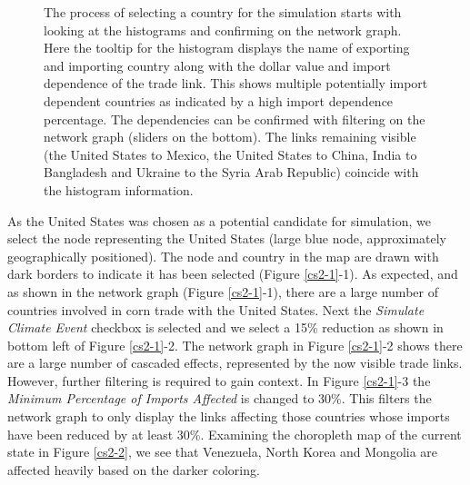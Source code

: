 \begin{figure}[htb]
	\caption[PROCESS OF SELECTING A COUNTRY FOR THE SIMULATION]{The process of selecting a country for the simulation starts with looking at the histograms and confirming on the network graph. Here the tooltip for the histogram displays the name of exporting and importing country along with the dollar value and import dependence of the trade link. This shows multiple potentially import dependent countries as indicated by a high import dependence percentage. The dependencies can be confirmed with filtering on the network graph (sliders on the bottom). The links remaining visible (the United States to Mexico, the United States to China, India to Bangladesh and Ukraine to the Syria Arab Republic) coincide with the histogram information.}
	\label{cs2-0}
\end{figure}
As the United States was chosen as a potential candidate for simulation, we select the node representing the United States (large blue node, approximately geographically positioned). The node and country in the map are drawn with dark borders to indicate it has been selected (Figure \ref{cs2-1}-1). As expected, and as shown in the network graph (Figure \ref{cs2-1}-1), there are a large number of countries involved in corn trade with the United States. Next the \textit{Simulate Climate Event} checkbox is selected and we select a 15\% reduction as shown in bottom left of Figure \ref{cs2-1}-2. The network graph in Figure \ref{cs2-1}-2 shows there are a large number of cascaded effects, represented by the now visible trade links. However, further filtering is required to gain context. In Figure \ref{cs2-1}-3 the \textit{Minimum Percentage of Imports Affected} is changed to 30\%. This filters the network graph to only display the links affecting those countries whose imports have been reduced by at least 30\%. Examining the choropleth map of the current state in Figure \ref{cs2-2}, we see that Venezuela, North Korea and Mongolia are affected heavily based on the darker coloring.\par
